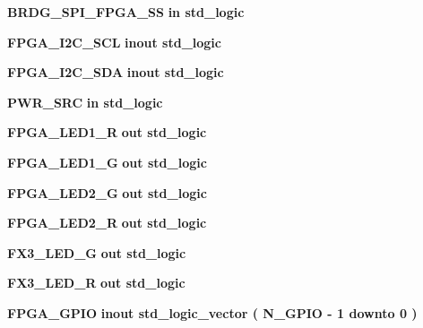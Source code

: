 \begin{DoxyCompactItemize}
\item 
{\bf B\+R\+D\+G\+\_\+\+S\+P\+I\+\_\+\+F\+P\+G\+A\+\_\+\+SS}  {\bfseries {\bfseries \textcolor{keywordflow}{in}\textcolor{vhdlchar}{ }}} {\bfseries \textcolor{comment}{std\+\_\+logic}\textcolor{vhdlchar}{ }} 
\item 
{\bf F\+P\+G\+A\+\_\+\+I2\+C\+\_\+\+S\+CL}  {\bfseries {\bfseries \textcolor{keywordflow}{inout}\textcolor{vhdlchar}{ }}} {\bfseries \textcolor{comment}{std\+\_\+logic}\textcolor{vhdlchar}{ }} 
\item 
{\bf F\+P\+G\+A\+\_\+\+I2\+C\+\_\+\+S\+DA}  {\bfseries {\bfseries \textcolor{keywordflow}{inout}\textcolor{vhdlchar}{ }}} {\bfseries \textcolor{comment}{std\+\_\+logic}\textcolor{vhdlchar}{ }} 
\item 
{\bf P\+W\+R\+\_\+\+S\+RC}  {\bfseries {\bfseries \textcolor{keywordflow}{in}\textcolor{vhdlchar}{ }}} {\bfseries \textcolor{comment}{std\+\_\+logic}\textcolor{vhdlchar}{ }} 
\item 
{\bf F\+P\+G\+A\+\_\+\+L\+E\+D1\+\_\+R}  {\bfseries {\bfseries \textcolor{keywordflow}{out}\textcolor{vhdlchar}{ }}} {\bfseries \textcolor{comment}{std\+\_\+logic}\textcolor{vhdlchar}{ }} 
\item 
{\bf F\+P\+G\+A\+\_\+\+L\+E\+D1\+\_\+G}  {\bfseries {\bfseries \textcolor{keywordflow}{out}\textcolor{vhdlchar}{ }}} {\bfseries \textcolor{comment}{std\+\_\+logic}\textcolor{vhdlchar}{ }} 
\item 
{\bf F\+P\+G\+A\+\_\+\+L\+E\+D2\+\_\+G}  {\bfseries {\bfseries \textcolor{keywordflow}{out}\textcolor{vhdlchar}{ }}} {\bfseries \textcolor{comment}{std\+\_\+logic}\textcolor{vhdlchar}{ }} 
\item 
{\bf F\+P\+G\+A\+\_\+\+L\+E\+D2\+\_\+R}  {\bfseries {\bfseries \textcolor{keywordflow}{out}\textcolor{vhdlchar}{ }}} {\bfseries \textcolor{comment}{std\+\_\+logic}\textcolor{vhdlchar}{ }} 
\item 
{\bf F\+X3\+\_\+\+L\+E\+D\+\_\+G}  {\bfseries {\bfseries \textcolor{keywordflow}{out}\textcolor{vhdlchar}{ }}} {\bfseries \textcolor{comment}{std\+\_\+logic}\textcolor{vhdlchar}{ }} 
\item 
{\bf F\+X3\+\_\+\+L\+E\+D\+\_\+R}  {\bfseries {\bfseries \textcolor{keywordflow}{out}\textcolor{vhdlchar}{ }}} {\bfseries \textcolor{comment}{std\+\_\+logic}\textcolor{vhdlchar}{ }} 
\item 
{\bf F\+P\+G\+A\+\_\+\+G\+P\+IO}  {\bfseries {\bfseries \textcolor{keywordflow}{inout}\textcolor{vhdlchar}{ }}} {\bfseries \textcolor{comment}{std\+\_\+logic\+\_\+vector}\textcolor{vhdlchar}{ }\textcolor{vhdlchar}{(}\textcolor{vhdlchar}{ }\textcolor{vhdlchar}{ }\textcolor{vhdlchar}{ }\textcolor{vhdlchar}{ }{\bfseries {\bf N\+\_\+\+G\+P\+IO}} \textcolor{vhdlchar}{-\/}\textcolor{vhdlchar}{ } \textcolor{vhdldigit}{1} \textcolor{vhdlchar}{ }\textcolor{keywordflow}{downto}\textcolor{vhdlchar}{ }\textcolor{vhdlchar}{ } \textcolor{vhdldigit}{0} \textcolor{vhdlchar}{ }\textcolor{vhdlchar}{)}\textcolor{vhdlchar}{ }} 

\end{DoxyCompactItemize}
